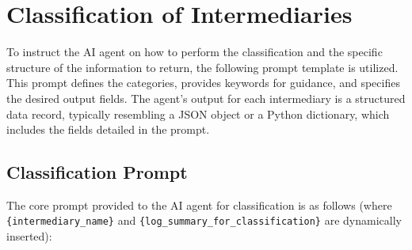 \section{Classification of Intermediaries}
\label{sec:appendix_intermediary_classification}

To instruct the AI agent on how to perform the classification and the specific structure of the information to return, the following prompt template is utilized. This prompt defines the categories, provides keywords for guidance, and specifies the desired output fields. The agent's output for each intermediary is a structured data record, typically resembling a JSON object or a Python dictionary, which includes the fields detailed in the prompt.

\subsection*{Classification Prompt}
The core prompt provided to the AI agent for classification is as follows (where \texttt{\{intermediary\_name\}} and \texttt{\{log\_summary\_for\_classification\}} are dynamically inserted):

